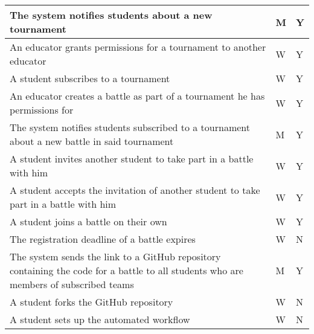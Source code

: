 \begin{center}
\begin{longtable}{|p{8.7cm}|p{3cm}|p{3cm}|}
        The system notifies students about a new tournament                                                                                   & M                      & Y               \\ \hline
        An educator grants permissions for a tournament to another educator                                                                   & W                      & Y               \\ \hline
        A student subscribes to a tournament                                                                                                  & W                      & Y               \\ \hline
        An educator creates a battle as part of a tournament he has permissions for                                                           & W                      & Y               \\ \hline
        The system notifies students subscribed to a tournament about a new battle in said tournament                                         & M                      & Y               \\ \hline
        A student invites another student to take part in a battle with him                                                                   & W                      & Y               \\ \hline
        A student accepts the invitation of another student to take part in a battle with him                                                 & W                      & Y               \\ \hline
        A student joins a battle on their own                                                                                                 & W                      & Y               \\ \hline
        The registration deadline of a battle expires                                                                                         & W                      & N               \\ \hline
        The system sends the link to a GitHub repository containing the code for a battle to all students who are members of subscribed teams & M                      & Y               \\ \hline
        A student forks the GitHub repository                                                                                                 & W                      & N               \\ \hline
        A student sets up the automated workflow                                                                                              & W                      & N               \\ \hline

\end{longtable}
\end{center}
